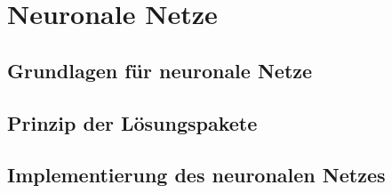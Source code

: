 \section{Neuronale Netze}

\begin{frame}

\end{frame}

\subsection{Grundlagen für neuronale Netze}

\begin{frame}

\end{frame}

\subsection{Prinzip der Lösungspakete}

\begin{frame}

\end{frame}

\subsection{Implementierung des neuronalen Netzes}

\begin{frame}

\end{frame}